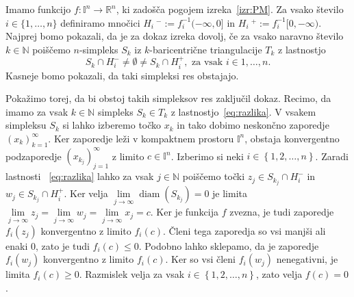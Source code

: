 \documentclass[mat1]{fmfdelo}
\newcommand{\R}{\mathbb R}
\newcommand{\N}{\mathbb N}
\DeclareMathOperator{\diam}{diam}
\newcommand{\I}{\mathbb I}
\newcommand{\0}{\underline{0}}
\begin{document}
\begin{dokaz}
Imamo funkcijo $f : \I^n \to  \R^n$, ki zadošča pogojem izreka~\ref{izr:PM}. Za vsako število $i \in \{ 1, \dots, n\}$ definiramo mnočici $H_i\ ^- := f_i^{-1} (-\infty, 0 ]$ in $H_i\ ^+ := f_i^{-1} [0, -\infty)$. Najprej bomo pokazali, da je za dokaz izreka dovolj, če za vsako naravno število $k \in \N$ poiščemo $n$-simpleks $S_k$ iz  $k$-baricentrične triangulacije $T_k$ z lastnostjo 
\begin{equation}\label{eq:razlika}
S_k \cap H_i^- \neq \emptyset \neq S_k \cap H_i^+, \text{ za vsak } i \in{1, \dots, n}.
\end{equation}
Kasneje bomo pokazali, da taki simpleksi res obstajajo.

Pokažimo torej, da bi obstoj takih simpleksov res zaključil dokaz. Recimo, da imamo za vsak $k \in \N$ simpleks $S_k \in T_k$ z lastnostjo~\eqref{eq:razlika}. V vsakem simpleksu $S_k$ si lahko izberemo točko $x_k$ in tako dobimo neskončno zaporedje $\left ( x_k \right ) _{k = 1}^{\infty}$. Ker zaporedje leži v kompaktnem prostoru $\I^n$, obstaja konvergentno podzaporedje $\left ( x_{k_j} \right ) _{j = 1}^{\infty}$ z limito $c \in \I^n$. Izberimo si neki $i \in \left \{1, 2, \dots, n\right \}$. Zaradi lastnosti ~\eqref{eq:razlika} lahko za vsak $j \in \N$ poiščemo točki $z_j \in S_{k_j} \cap H_i^-$ in $w_j \in S_{k_j} \cap H_i^+$. Ker velja $\lim\limits_{j \to \infty} \diam(S_{k_j}) = 0$ je limita  $\lim\limits_{j \to \infty} z_j = \lim\limits_{j \to \infty} w_j = \lim\limits_{j \to \infty} x_j = c$. Ker je funkcija $f$ zvezna, je tudi zaporedje $f_i(z_j)$ konvergentno z limito $f_i(c)$. Členi tega zaporedja so vsi manjši ali enaki $0$, zato je tudi $f_i(c) \leq 0$. Podobno lahko sklepamo, da je zaporedje $f_i(w_j)$ konvergentno z limito $f_i(c)$. Ker so vsi členi $f_i(w_j)$ nenegativni, je limita $f_i(c) \geq 0$. Razmislek velja za vsak $i \in \left \{1, 2, \dots, n\right \}$, zato velja $f(c) = 0$.

\begin{figure}[h!]
	\centering
\end{figure}
\end{dokaz}
\end{document}
